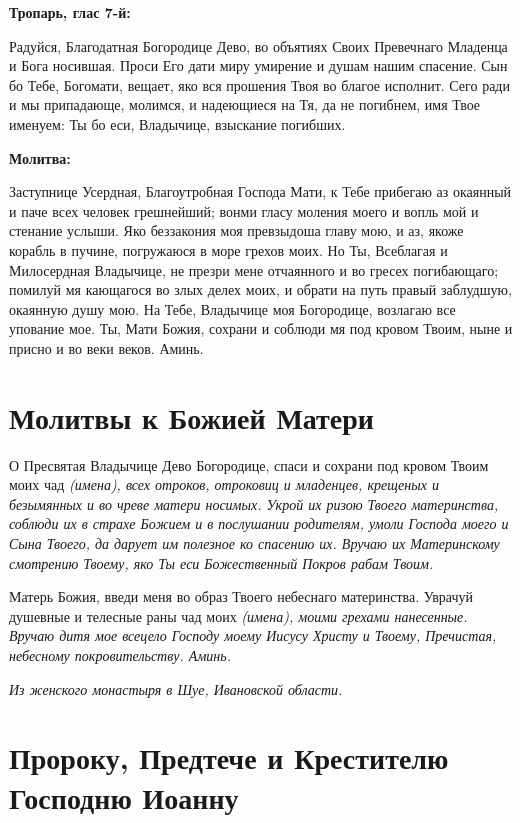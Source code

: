 \bfseries Тропарь, глас 7-й:\normalfont{}


Радуйся, Благодатная Богородице Дево, во объятиях Своих Превечнаго Младенца и Бога носившая. Проси Его дати миру умирение и душам нашим спасение. Сын бо Тебе, Богомати, вещает, яко вся прошения Твоя во благое исполнит. Сего ради и мы припадающе, молимся, и надеющиеся на Тя, да не погибнем, имя Твое именуем: Ты бо еси, Владычице, взыскание погибших.


\medskip
\bfseries Молитва:\normalfont{}


Заступнице Усердная, Благоутробная Господа Мати, к Тебе прибегаю аз окаянный и паче всех человек грешнейший; вонми гласу моления моего и вопль мой и стенание услыши. Яко беззакония моя превзыдоша главу мою, и аз, якоже корабль в пучине, погружаюся в море грехов моих. Но Ты, Всеблагая и Милосердная Владычице, не презри мене отчаянного и во гресех погибающаго; помилуй мя кающагося во злых делех моих, и обрати на путь правый заблудшую, окаянную душу мою. На Тебе, Владычице моя Богородице, возлагаю все упование мое. Ты, Мати Божия, сохрани и соблюди мя под кровом Твоим, ныне и присно и во веки веков. Аминь.

\section{Молитвы к Божией Матери}
 


О Пресвятая Владычице Дево Богородице, спаси и сохрани под кровом Твоим моих чад \itshape (имена)\normalfont{}, всех отроков, отроковиц и младенцев, крещеных и безымянных и во чреве матери носимых. Укрой их ризою Твоего материнства, соблюди их в страхе Божием и в послушании родителям, умоли Господа моего и Сына Твоего, да дарует им полезное ко спасению их. Вручаю их Материнскому смотрению Твоему, яко Ты еси Божественный Покров рабам Твоим.

Матерь Божия, введи меня во образ Твоего небеснаго материнства. Уврачуй душевные и телесные раны чад моих \itshape (имена)\normalfont{}, моими грехами нанесенные. Вручаю дитя мое всецело Господу моему Иисусу Христу и Твоему, Пречистая, небесному покровительству. Аминь.

\itshape Из женского монастыря в Шуе, Ивановской области.\normalfont{} 


\section{Пророку, Предтече и Крестителю Господню Иоанну}
 
